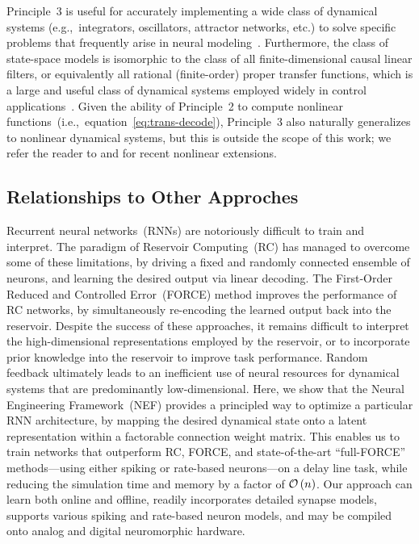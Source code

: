 Principle~3 is useful for accurately implementing a wide class of dynamical systems (e.g.,~integrators, oscillators, attractor networks, etc.) to solve specific problems that frequently arise in neural modeling~\citep[e.g.,][]{eliasmith2000b, singh2004, eliasmith2005b, singh2006}.
Furthermore, the class of state-space models is isomorphic to the class of all finite-dimensional causal linear filters, or equivalently all rational (finite-order) proper transfer functions, which is a large and useful class of dynamical systems employed widely in control applications~\citep{brogan1982modern}.
Given the ability of Principle~2 to compute nonlinear functions~(i.e.,~equation~\ref{eq:trans-decode}), Principle~3 also naturally generalizes to nonlinear dynamical systems, but this is outside the scope of this work; we refer the reader to \citet{voelker2017iscas} and \citet{voelker2017neuromorphic} for recent nonlinear extensions.

\subsection{Relationships to Other Approches}
\label{sec:relationships}

\citep{sussillo2013opening}

Recurrent neural networks~(RNNs) are notoriously difficult to train and interpret.
The paradigm of Reservoir Computing~(RC) has managed to overcome some of these limitations, by driving a fixed and randomly connected ensemble of neurons, and learning the desired output via linear decoding.
The First-Order Reduced and Controlled Error~(FORCE) method improves the performance of RC networks, by simultaneously re-encoding the learned output back into the reservoir. 
Despite the success of these approaches, it remains difficult to interpret the high-dimensional representations employed by the reservoir, or to incorporate prior knowledge into the reservoir to improve task performance.
Random feedback ultimately leads to an inefficient use of neural resources for dynamical systems that are predominantly low-dimensional.
Here, we show that the Neural Engineering Framework~(NEF) provides a principled way to optimize a particular RNN architecture, by mapping the desired dynamical state onto a latent representation within a factorable connection weight matrix.
This enables us to train networks that outperform RC, FORCE, and state-of-the-art ``full-FORCE'' methods---using either spiking or rate-based neurons---on a delay line task, while reducing the simulation time and memory by a factor of $\mathcal{O}\left({n}\right)$.
Our approach can learn both online and offline, readily incorporates detailed synapse models, supports various spiking and rate-based neuron models, and may be compiled onto analog and digital neuromorphic hardware.

